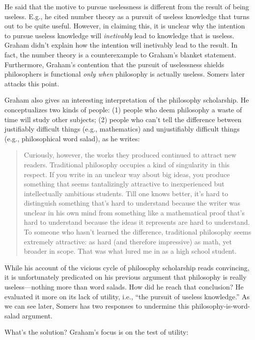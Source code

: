 \documentclass[12pt]{article}
\begin{document}
He said that the motive to pursue uselessness is different from the result of being useless. E.g., he cited number theory as a pursuit of useless knowledge that turns out to be quite useful. However, in claiming this, it is unclear why the intention to pursue useless knowledge will \emph{inetivably} lead to knowledge that is useless. Graham didn't explain how the intention will inetivably lead to the result. In fact, the number theory is a counterexample to Graham's blanket statement. Furthermore, Graham's contention that the pursuit of uselessness shields philosophers is functional \emph{only when} philosophy is actually useless. Somers later attacks this point.

Graham also gives an interesting interpretation of the philosophy scholarship. He conceptualizes two kinds of people: (1) people who deem philosophy a waste of time will study other subjects; (2) people who can't tell the difference between justifiably difficult things (e.g., mathematics) and unjustifiably difficult things (e.g., philosophical word salad), as he writes:

\begin{quotation}
	Curiously, however, the works they produced continued to attract new readers. Traditional philosophy occupies a kind of singularity in this respect. If you write in an unclear way about big ideas, you produce something that seems tantalizingly attractive to inexperienced but intellectually ambitious students. Till one knows better, it's hard to distinguish something that's hard to understand because the writer was unclear in his own mind from something like a mathematical proof that's hard to understand because the ideas it represents are hard to understand. To someone who hasn't learned the difference, traditional philosophy seems extremely attractive: as hard (and therefore impressive) as math, yet broader in scope. That was what lured me in as a high school student.
\end{quotation}

While his account of the vicious cycle of philosophy scholarship reads convincing, it is unfortunately predicated on his previous argument that philosophy is really useless---nothing more than word salads. How did he reach that conclusion? He evaluated it more on its lack of utility, i.e., \enquote{the pursuit of useless knowledge.} As we can see later, Somers has two responses to undermine this philosophy-is-word-salad argument.

What's the solution? Graham's focus is on the test of utility:
\end{document}
